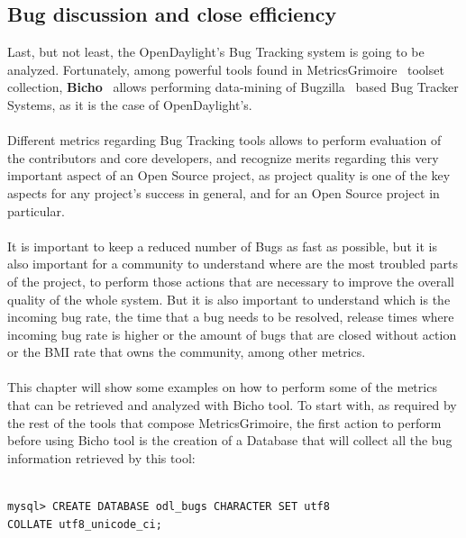 \documentclass[a4paper, 12pt]{book}
\begin{document}
\subsection{Bug discussion and close efficiency}
Last, but not least, the OpenDaylight's Bug Tracking system is going to be analyzed. Fortunately, among powerful tools found in MetricsGrimoire~\cite{MetricsGrimore} toolset collection, \textbf{Bicho}~\cite{Bicho} allows performing data-mining of Bugzilla~\cite{Bugzilla} based Bug Tracker Systems, as it is the case of OpenDaylight's.\\
\\
Different metrics regarding Bug Tracking tools allows to perform evaluation of the contributors and core developers, and recognize merits regarding this very important aspect of an Open Source project, as project quality is one of the key aspects for any project's success in general, and for an Open Source project in particular.\\
\\
It is important to keep a reduced number of Bugs as fast as possible, but it is also important for a community to understand where are the most troubled parts of the project, to perform those actions that are necessary to improve the overall quality of the whole system. But it is also important to understand which is the incoming bug rate, the time that a bug needs to be resolved, release times where incoming bug rate is higher or the amount of bugs that are closed without action or the BMI rate that owns the community, among other metrics.\\
\\
This chapter will show some examples on how to perform some of the metrics that can be retrieved and analyzed with Bicho tool. To start with, as required by the rest of the tools that compose MetricsGrimoire, the first action to perform before using Bicho tool is the creation of a Database that will collect all the bug information retrieved by this tool:
\begin{verbatim}

mysql> CREATE DATABASE odl_bugs CHARACTER SET utf8
COLLATE utf8_unicode_ci;

\end{verbatim}
\end{document}
